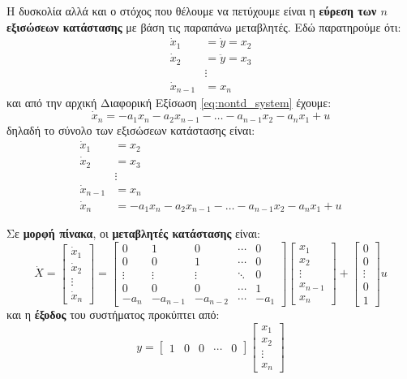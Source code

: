 \documentclass[11pt,a4paper,notitlepage,fleqn,final]{article}
\begin{document}
Η δυσκολία αλλά και ο στόχος που θέλουμε να πετύχουμε είναι η \textbf{εύρεση των \( n \) εξισώσεων κατάστασης} με βάση τις παραπάνω μεταβλητές. Εδώ παρατηρούμε ότι:
\begin{align*}
	\dot x_1 &= \dot y = x_2\\
	\dot x_2 &= \ddot y = x_3 \\
	&\vdots \\
	\dot x_{n-1} &= x_n
\end{align*}
και από την αρχική Διαφορική Εξίσωση \eqref{eq:nontd_system} έχουμε:
\[
\dot x_n = -a_1x_n -a_2x_{n-1} - \dots - a_{n-1}x_2 -a_nx_1 + u
\]
δηλαδή το σύνολο των εξισώσεων κατάστασης είναι:
\begin{align*}
\dot x_1 &= x_2\\
\dot x_2 &= x_3 \\
&\vdots \\
\dot x_{n-1} &= x_n\\
\dot x_n &= -a_1x_n -a_2x_{n-1} - \dots - a_{n-1}x_2 -a_nx_1 + u
\end{align*}

Σε \textbf{μορφή πίνακα}, οι \textbf{μεταβλητές κατάστασης} είναι:
\[
\dot X = \left[\begin{matrix}
\dot x_1 \\ \dot x_2 \\ \vdots \\ \dot x_n
\end{matrix}\right] = \left[
\begin{matrix}
0 & 1 & 0 & \cdots & 0 \\
0 & 0 & 1 & \cdots & 0 \\
\vdots & \vdots & \vdots & \ddots & 0\\
0 & 0 & 0 & \cdots & 1 \\
-a_n & - a_{n-1} & - a_{n-2} & \cdots & -a_1
\end{matrix}
\right] \left[\begin{matrix}
x_1 \\  x_2 \\ \vdots \\ x_{n-1} \\ x_n
\end{matrix}\right]
+ \left[\begin{matrix}
0\\0\\\vdots\\0\\1
\end{matrix}\right]u
\]
και η \textbf{έξοδος} του συστήματος προκύπτει από:
\[
y= \left[\begin{matrix}
1 & 0 & 0 & \cdots & 0
\end{matrix}\right]\left[\begin{matrix}
x_1\\x_2\\\vdots\\x_n
\end{matrix}\right]
\]
\end{document}
